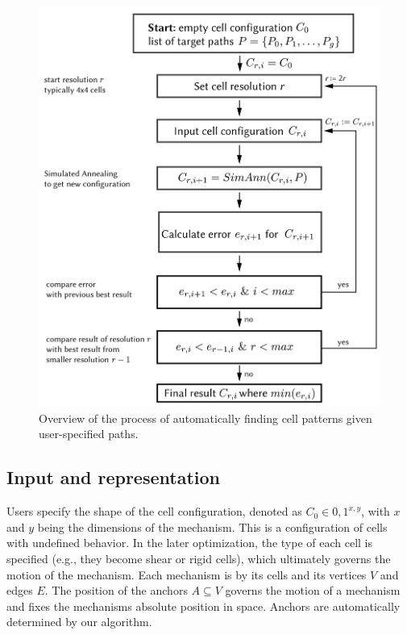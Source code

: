 \begin{figure} [!h]
    \centering
    \includegraphics[width=\textwidth]{chapters/understanding-metamaterial-mechanisms-FIG/13-optimization-overview.png}
    \caption[Short figure name.]{Overview of the process of automatically finding cell patterns given user-specified paths.
    \label{fig:13-optimization-overview}}
\end{figure}


\subsection{Input and representation}

Users specify the shape of the cell configuration, denoted as $C_0\in{0,1}^{x,y}$, with $x$ and $y$ being the dimensions of the mechanism. This is a configuration of cells with undefined behavior. In the later optimization, the type of each cell is specified (e.g., they become shear or rigid cells), which ultimately governs the motion of the mechanism. Each mechanism is by its cells and its vertices $V$ and edges $E$. The position of the anchors $A\subseteq V$ governs the motion of a mechanism and fixes the mechanisms absolute position in space. Anchors are automatically determined by our algorithm.


